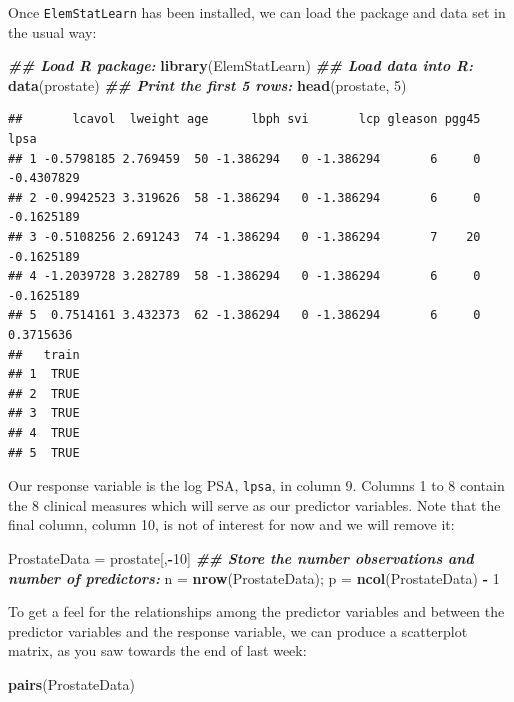 \documentclass[
]{article}
\newenvironment{Shaded}{\begin{snugshade}}{\end{snugshade}}
\newcommand{\DecValTok}[1]{\textcolor[rgb]{0.00,0.00,0.81}{#1}}
\newcommand{\DocumentationTok}[1]{\textcolor[rgb]{0.56,0.35,0.01}{\textbf{\textit{#1}}}}
\newcommand{\FunctionTok}[1]{\textcolor[rgb]{0.13,0.29,0.53}{\textbf{#1}}}
\newcommand{\NormalTok}[1]{#1}
\newcommand{\OtherTok}[1]{\textcolor[rgb]{0.56,0.35,0.01}{#1}}
\newcommand{\SpecialCharTok}[1]{\textcolor[rgb]{0.81,0.36,0.00}{\textbf{#1}}}
\begin{document}
Once \texttt{ElemStatLearn} has been installed, we can load the package
and data set in the usual way:

\begin{Shaded}
\begin{Highlighting}[]
\DocumentationTok{\#\# Load R package:}
\FunctionTok{library}\NormalTok{(ElemStatLearn)}
\DocumentationTok{\#\# Load data into R:}
\FunctionTok{data}\NormalTok{(prostate)}
\DocumentationTok{\#\# Print the first 5 rows:}
\FunctionTok{head}\NormalTok{(prostate, }\DecValTok{5}\NormalTok{)}
\end{Highlighting}
\end{Shaded}

\begin{verbatim}
##       lcavol  lweight age      lbph svi       lcp gleason pgg45       lpsa
## 1 -0.5798185 2.769459  50 -1.386294   0 -1.386294       6     0 -0.4307829
## 2 -0.9942523 3.319626  58 -1.386294   0 -1.386294       6     0 -0.1625189
## 3 -0.5108256 2.691243  74 -1.386294   0 -1.386294       7    20 -0.1625189
## 4 -1.2039728 3.282789  58 -1.386294   0 -1.386294       6     0 -0.1625189
## 5  0.7514161 3.432373  62 -1.386294   0 -1.386294       6     0  0.3715636
##   train
## 1  TRUE
## 2  TRUE
## 3  TRUE
## 4  TRUE
## 5  TRUE
\end{verbatim}

Our response variable is the log PSA, \texttt{lpsa}, in column 9.
Columns 1 to 8 contain the 8 clinical measures which will serve as our
predictor variables. Note that the final column, column 10, is not of
interest for now and we will remove it:

\begin{Shaded}
\begin{Highlighting}[]
\NormalTok{ProstateData }\OtherTok{=}\NormalTok{ prostate[,}\SpecialCharTok{{-}}\DecValTok{10}\NormalTok{]}
\DocumentationTok{\#\# Store the number observations and number of predictors:}
\NormalTok{n }\OtherTok{=} \FunctionTok{nrow}\NormalTok{(ProstateData); p }\OtherTok{=} \FunctionTok{ncol}\NormalTok{(ProstateData) }\SpecialCharTok{{-}} \DecValTok{1}
\end{Highlighting}
\end{Shaded}

To get a feel for the relationships among the predictor variables and
between the predictor variables and the response variable, we can
produce a scatterplot matrix, as you saw towards the end of last week:

\begin{Shaded}
\begin{Highlighting}[]
\FunctionTok{pairs}\NormalTok{(ProstateData)}
\end{Highlighting}
\end{Shaded}
\end{document}
